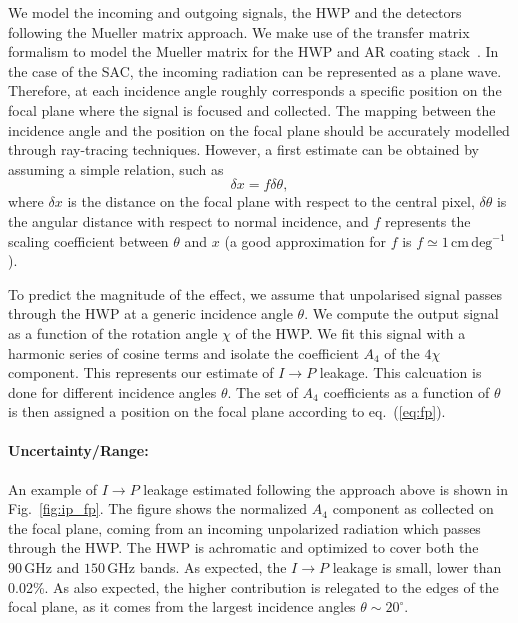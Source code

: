 We model the incoming and outgoing signals, the HWP and the detectors following the Mueller matrix approach. We make use of the transfer matrix formalism to model the Mueller matrix for the HWP and AR coating stack~\cite{Essinger-Hileman_TM}. In the case of the SAC, the incoming radiation can be represented as a plane wave. Therefore, at each incidence angle roughly corresponds a specific position on the focal plane where the signal is focused and collected. The mapping between the incidence angle and the position on the focal plane should be accurately modelled through ray-tracing techniques. However, a first estimate can be obtained by assuming a simple relation, such as 
\begin{equation}\label{eq:fp}
\delta x= f \delta \theta,
\end{equation}
where $\delta x$ is the distance on the focal plane with respect to the central pixel, $\delta \theta$ is the angular distance with respect to normal incidence, and $f$ represents the scaling coefficient between $\theta$ and $x$ (a good approximation for $f$ is $f\simeq 1\,\mathrm{cm\,deg^{-1}}$).

To predict the magnitude of the effect, we assume that unpolarised signal passes through the HWP at a generic incidence angle $\theta$. We compute the output signal as a function of the rotation angle $\chi$ of the HWP. We fit this signal with a harmonic series of cosine terms and isolate the coefficient $A_4$ of the $4\chi$ component. This represents our estimate of $I\rightarrow P$ leakage. This calcuation is done for different incidence angles $\theta$. The set of $A_4$ coefficients as a function of $\theta$ is then assigned a position on the focal plane according to eq.~(\ref{eq:fp}).

\paragraph{Uncertainty/Range:}
An example of $I\rightarrow P$ leakage estimated following the approach above is shown in Fig.~\ref{fig:ip_fp}. The figure shows the normalized $A_4$ component as collected on the focal plane, coming from an incoming unpolarized radiation which passes through the HWP. The HWP is achromatic and optimized to cover both the $90\,\mathrm{GHz}$ and $150\,\mathrm{GHz}$ bands. As expected, the $I\rightarrow P$ leakage is small, lower than 0.02\%. As also expected, the higher contribution is relegated to the edges of the focal plane, as it comes from the largest incidence angles $\theta\sim 20^\circ$.

